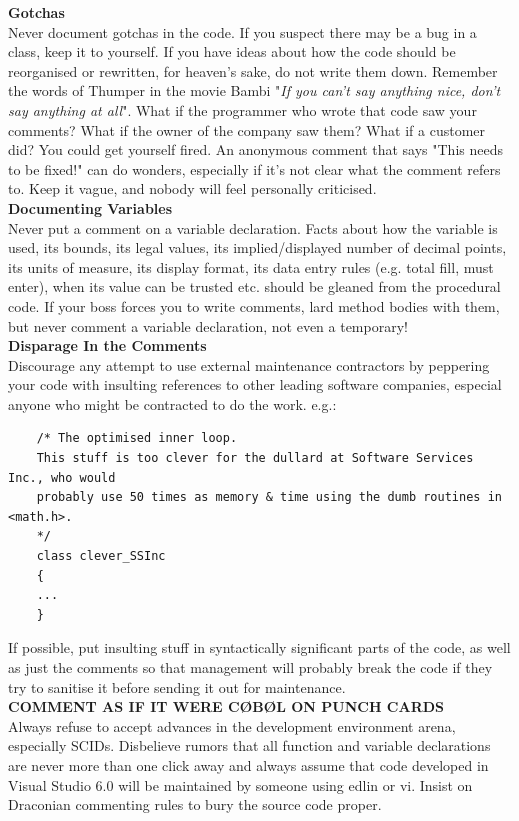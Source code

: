 \documentclass[11pt,twoside,a4paper]{article}
\begin{document}
\textbf{Gotchas}~\\
Never document gotchas in the code. If you suspect there may be a bug in a class, keep it to yourself. If you have ideas about how the code should be reorganised or rewritten, for heaven's sake, do not write them down. Remember the words of Thumper in the movie Bambi "\emph{If you can't say anything nice, don't say anything at all}". What if the programmer who wrote that code saw your comments? What if the owner of the company saw them? What if a customer did? You could get yourself fired. An anonymous comment that says "This needs to be fixed!" can do wonders, especially if it's not clear what the comment refers to. Keep it vague, and nobody will feel personally criticised.~\\ 

\textbf{Documenting Variables}~\\
Never put a comment on a variable declaration. Facts about how the variable is used, its bounds, its legal values, its implied/displayed number of decimal points, its units of measure, its display format, its data entry rules (e.g. total fill, must enter), when its value can be trusted etc. should be gleaned from the procedural code. If your boss forces you to write comments, lard method bodies with them, but never comment a variable declaration, not even a temporary!~\\ 

\textbf{Disparage In the Comments}~\\
Discourage any attempt to use external maintenance contractors by peppering your code with insulting references to other leading software companies, especial anyone who might be contracted to do the work. e.g.:
\begin{verbatim}
	/* The optimised inner loop. 
	This stuff is too clever for the dullard at Software Services Inc., who would 
	probably use 50 times as memory & time using the dumb routines in <math.h>. 
	*/ 
	class clever_SSInc 
	{ 
	... 
	}
\end{verbatim}
If possible, put insulting stuff in syntactically significant parts of the code, as well as just the comments so that management will probably break the code if they try to sanitise it before sending it out for maintenance. ~\\

\textbf{COMMENT AS IF IT WERE C\O B\O L ON PUNCH CARDS}~\\
Always refuse to accept advances in the development environment arena, especially SCIDs. Disbelieve rumors that all function and variable declarations are never more than one click away and always assume that code developed in Visual Studio 6.0 will be maintained by someone using edlin or vi. Insist on Draconian commenting rules to bury the source code proper.~\\ 
\end{document}
